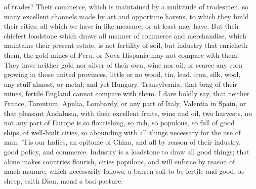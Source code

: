 {of trades? Their commerce, which is maintained by a multitude of
tradesmen, so many excellent channels made by art and opportune havens,
to which they build their cities; all which we have in like measure, or
at least may have. But their chiefest loadstone which draws all manner
of commerce and merchandise, which maintains their present estate, is
not fertility of soil, but industry that enricheth them, the gold mines
of Peru, or Nova Hispania may not compare with them. They have neither
gold nor silver of their own, wine nor oil, or scarce any corn growing
in those united provinces, little or no wood, tin, lead, iron, silk,
wool, any stuff almost, or metal; and yet Hungary, Transylvania, that
brag of their mines, fertile England cannot compare with them. I dare
boldly say, that neither France, Tarentum, Apulia, Lombardy, or any
part of Italy, Valentia in Spain, or that pleasant Andalusia, with
their excellent fruits, wine and oil, two harvests, no not any part of
Europe is so flourishing, so rich, so populous, so full of good ships,
of well-built cities, so abounding with all things necessary for the
use of man. 'Tis our Indies, an epitome of China, and all by reason of
their industry, good policy, and commerce. Industry is a loadstone to
draw all good things; that alone makes countries flourish, cities
populous, and will enforce by reason of much manure, which
necessarily follows, a barren soil to be fertile and good, as sheep,
saith Dion, mend a bad pasture.

}
